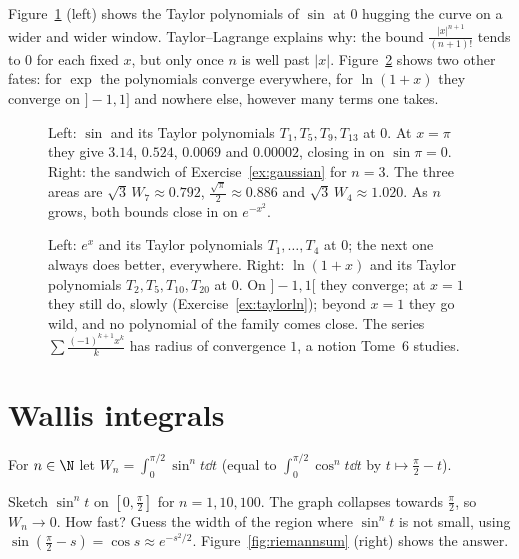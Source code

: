 Figure~\ref{fig:taylor} (left) shows the Taylor polynomials of $\sin$ at $0$ hugging the curve on a wider and wider window. Taylor--Lagrange explains why: the bound $\frac{|x|^{n+1}}{(n+1)!}$ tends to $0$ for each fixed $x$, but only once $n$ is well past $|x|$. Figure~\ref{fig:taylorexp} shows two other fates: for $\exp$ the polynomials converge everywhere, for $\ln(1+x)$ they converge on $]-1,1]$ and nowhere else, however many terms one takes.

\begin{figure}[ht]
\centering
{}
\caption{Left: $\sin$ and its Taylor polynomials $T_1,T_5,T_9,T_{13}$ at $0$. At $x=\pi$ they give $3.14$, $0.524$, $0.0069$ and $0.00002$, closing in on $\sin\pi=0$. Right: the sandwich of Exercise~\ref{ex:gaussian} for $n=3$. The three areas are $\sqrt3\,W_7\approx0.792$, $\frac{\sqrt\pi}2\approx0.886$ and $\sqrt3\,W_4\approx1.020$. As $n$ grows, both bounds close in on $e^{-x^2}$.}
\label{fig:taylor}
\end{figure}

\begin{figure}[ht]
\centering
{}
\caption{Left: $e^x$ and its Taylor polynomials $T_1,\dots,T_4$ at $0$; the next one always does better, everywhere. Right: $\ln(1+x)$ and its Taylor polynomials $T_2,T_5,T_{10},T_{20}$ at $0$. On $]-1,1[$ they converge; at $x=1$ they still do, slowly (Exercise~\ref{ex:taylorln}); beyond $x=1$ they go wild, and no polynomial of the family comes close. The series $\sum\frac{(-1)^{k+1}x^k}k$ has radius of convergence $1$, a notion Tome~6 studies.}
\label{fig:taylorexp}
\end{figure}

\section{Wallis integrals}

For $n\in\N$ let $W_n=\displaystyle\int_0^{\pi/2}\sin^nt\dd t$ (equal to $\int_0^{\pi/2}\cos^nt\dd t$ by $t\mapsto\frac\pi2-t$).

\begin{think}
Sketch $\sin^nt$ on $\left[0,\frac\pi2\right]$ for $n=1,10,100$. The graph collapses towards $\frac\pi2$, so $W_n\to0$. How fast? Guess the width of the region where $\sin^nt$ is not small, using $\sin\left(\frac\pi2-s\right)=\cos s\approx e^{-s^2/2}$. Figure~\ref{fig:riemannsum} (right) shows the answer.
\end{think}

